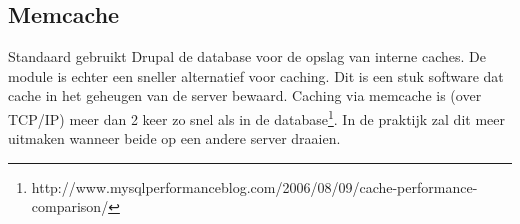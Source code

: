 \subsection{Memcache}\label{memcache}

Standaard gebruikt Drupal de database voor de opslag van interne caches. De  module is echter een sneller alternatief voor caching. Dit is een stuk software dat cache in het geheugen van de server bewaard. Caching via memcache is (over TCP/IP) meer dan 2 keer zo snel als in de database\footnote{http://www.mysqlperformanceblog.com/2006/08/09/cache-performance-comparison/}. In de praktijk zal dit meer uitmaken wanneer beide op een andere server draaien.
